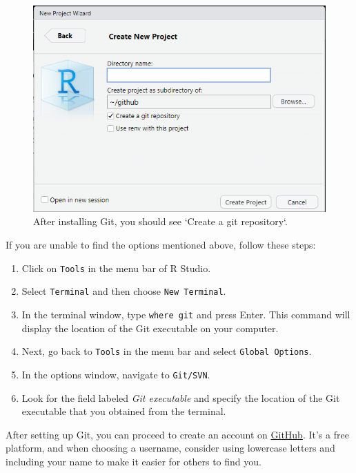 \documentclass[
]{book}
\providecommand{\tightlist}{%
  \setlength{\itemsep}{0pt}\setlength{\parskip}{0pt}}
\begin{document}
\begin{figure}

{\centering \includegraphics[width=8.24in]{image/git_image01} 

}

\caption{After installing Git, you should see `Create a git repository`.}\label{fig:gitcheck}
\end{figure}

If you are unable to find the options mentioned above, follow these steps:

\begin{enumerate}
\def\labelenumi{\arabic{enumi}.}
\tightlist
\item
  Click on \texttt{Tools} in the menu bar of R Studio.
\item
  Select \texttt{Terminal} and then choose \texttt{New\ Terminal}.
\item
  In the terminal window, type \texttt{where\ git} and press Enter. This command will display the location of the Git executable on your computer.
\item
  Next, go back to \texttt{Tools} in the menu bar and select \texttt{Global\ Options}.
\item
  In the options window, navigate to \texttt{Git/SVN}.
\item
  Look for the field labeled \emph{Git executable} and specify the location of the Git executable that you obtained from the terminal.
\end{enumerate}

After setting up Git, you can proceed to create an account on \href{https://github.com/}{GitHub}. It's a free platform, and when choosing a username, consider using lowercase letters and including your name to make it easier for others to find you.
\end{document}
